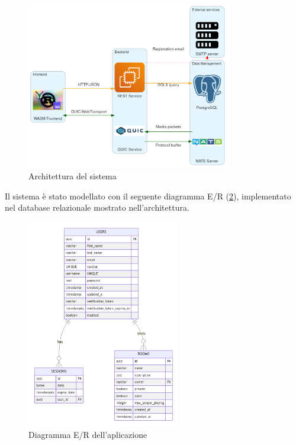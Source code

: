 \documentclass{article}
\begin{document}
\begin{figure}[h]
  \begin{center}
    \includegraphics[width=0.8\textwidth]{figures/architecture_cropped.png}
  \end{center}
  \caption{Architettura del sistema}\label{fig:architecture}
\end{figure}

Il sistema è stato modellato con il seguente diagramma E/R (\cref{fig:er}), implementato nel database 
relazionale mostrato nell'architettura. 

\begin{figure}[h]
  \begin{center}
    \includegraphics[width=0.6\textwidth]{figures/er.png}
  \end{center}
  \caption{Diagramma E/R dell'aplicazione}\label{fig:er}
\end{figure}
\end{document}
